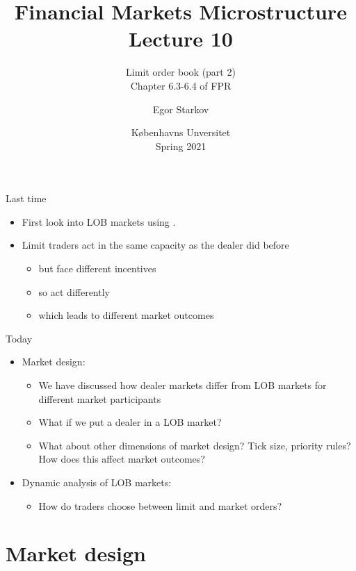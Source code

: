 \documentclass[english,10pt
,aspectratio=169
]{beamer}
\title{Financial Markets Microstructure \\ Lecture 10}
\subtitle{Limit order book (part 2)\\
	Chapter 6.3-6.4 of FPR}
\author{Egor Starkov}
\date{K{\o}benhavns Unversitet \\
	Spring 2021}
\begin{document}
\frame[plain]{\titlepage}


\begin{frame}{Last time}
	\begin{itemize}
		\item First look into LOB markets using \cite{glosten_is_1994}.
		\item Limit traders act in the same capacity as the dealer did before
		\begin{itemize}
			\item but face different incentives
			\item so act differently
			\item which leads to different market outcomes
		\end{itemize}
	\end{itemize}
\end{frame}


\begin{frame}{Today}
	\begin{itemize}
		\item Market design:
		\begin{itemize}
			\item We have discussed how dealer markets differ from LOB markets for different market participants
			\item What if we put a dealer in a LOB market?
			\item What about other dimensions of market design? Tick size, priority rules? How does this affect market outcomes?
		\end{itemize}
		\item Dynamic analysis of LOB markets:
		\begin{itemize}
			\item How do traders choose between limit and market orders?
		\end{itemize}
	\end{itemize}
\end{frame}







\section{Market design}
\end{document}
